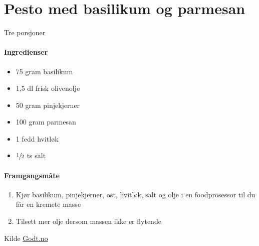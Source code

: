 \section{Pesto med basilikum og parmesan}
Tre porsjoner

\paragraph{Ingredienser}
\begin{itemize}[noitemsep]
	\item 75 gram basilikum
	\item 1,5 dl frisk olivenolje
	\item 50 gram pinjekjerner
	\item 100 gram parmesan
	\item 1 fedd hvitløk
	\item $\sfrac{1}{2}$ ts salt
\end{itemize}

\paragraph{Framgangsmåte}
\begin{enumerate}[noitemsep]
	\item Kjør basilikum, pinjekjerner, ost, hvitløk, salt og olje i en foodprosessor til du får en kremete masse
	\item Tilsett mer olje dersom massen ikke er flytende
\end{enumerate}

Kilde \href{http://www.godt.no/o2055}{Godt.no}
